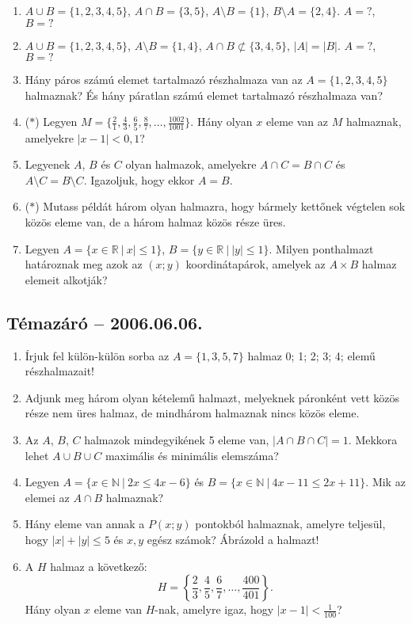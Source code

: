 \documentclass{article}
\begin{document}
\begin{enumerate}
\item $A\cup B=\{1,2,3,4,5\}$, $A\cap B=\{3,5\}$, $A\setminus B=\{1\}$,
$B\setminus A=\{2,4\}$. $A=?$, $B=?$
\item $A\cup B=\{1,2,3,4,5\}$, $A\setminus B=\{1,4\}$, $A\cap B\not\subset\{3,4,5\}$, $|A|=|B|$. $A=?$, $B=?$
\item Hány páros számú elemet tartalmazó részhalmaza van az $A=\{1,2,3,4,5\}$ halmaznak? És hány páratlan számú elemet tartalmazó részhalmaza van?
\item ($*$) Legyen $M=\{\frac{2}{1},\frac{4}{3},\frac{6}{5},\frac{8}{7},\ldots,\frac{1002}{1001}\}$. Hány olyan $x$ eleme van az $M$ halmaznak, amelyekre $|x-1|<0{,}1$?
\item Legyenek $A$, $B$ és $C$ olyan halmazok, amelyekre $A\cap C = B\cap C$ és
$A\setminus C=B\setminus C$. Igazoljuk, hogy ekkor $A=B$.
\item ($*$) Mutass példát három olyan halmazra, hogy bármely kettőnek végtelen sok közös eleme van, de a három halmaz közös része üres.
\item Legyen $A=\{x\in \mathbb{R}~|~x|\le 1\}$, $B=\{y\in \mathbb{R}~|~|y|\le 1\}$.
Milyen ponthalmazt határoznak meg azok az $(x;y)$ koordinátapárok, amelyek az $A\times B$ halmaz elemeit alkotják?
\end{enumerate}

\subsection*{Témazáró -- 2006.06.06.}

\begin{enumerate}
\item Írjuk fel külön-külön sorba az $A=\{1,3,5,7\}$ halmaz 0; 1; 2; 3; 4; elemű részhalmazait!
\item Adjunk meg három olyan kételemű halmazt, melyeknek páronként vett közös része nem üres halmaz, de mindhárom halmaznak nincs közös eleme.
\item Az $A$, $B$, $C$ halmazok mindegyikének 5 eleme van, $|A\cap B \cap C|=1$.
Mekkora lehet $A\cup B \cup C$ maximális és minimális elemszáma?
\item Legyen $A=\{x\in\mathbb{N} ~|~ 2x\le 4x-6\}$ és $B=\{x\in\mathbb{N}~|~4x-11\le 2x+11\}$. Mik az elemei az $A\cap B$ halmaznak?
\item Hány eleme van annak a $P(x;y)$ pontokból halmaznak, amelyre teljesül, hogy $|x|+|y|\le 5$ és $x,y$ egész számok? Ábrázold a halmazt!
\item A $H$ halmaz a következő:
$$H=\left\{\frac{2}{3},\frac{4}{5},\frac{6}{7},\ldots,\frac{400}{401}\right\}.$$
Hány olyan $x$ eleme van $H$-nak, amelyre igaz, hogy $|x-1|<\frac{1}{100}$?
\end{enumerate}
\end{document}
